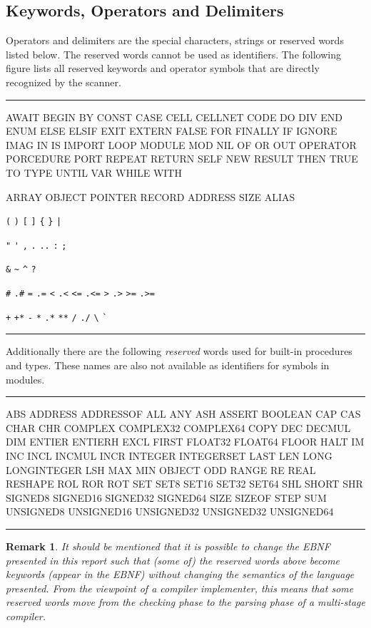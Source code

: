 \documentclass[a4wide,11pt]{article}
\newtheorem{remark}{Remark}
\newcommand{\srcfont}{\usefont{T1}{lmtt}{b}{n}}
\newenvironment{codebox}{%
\par
\begin{minipage}{\linewidth}
\hrule\vspace{0.1cm}
}{
\vspace{0.1cm}
\hrule
\end{minipage}
}
\begin{document}
\subsection{Keywords, Operators and Delimiters}
Operators and delimiters are the special characters, strings or reserved words listed below.
The reserved words cannot be used as identifiers.
The following figure lists all reserved keywords and operator symbols that are directly recognized by the scanner.

\begin{codebox}
{\srcfont
AWAIT BEGIN BY CONST CASE CELL CELLNET CODE DO DIV END ENUM ELSE ELSIF EXIT EXTERN FALSE FOR FINALLY IF IGNORE IMAG IN IS IMPORT LOOP MODULE MOD NIL OF OR OUT OPERATOR PORCEDURE PORT REPEAT RETURN SELF NEW RESULT THEN TRUE TO TYPE UNTIL VAR WHILE WITH

ARRAY OBJECT POINTER RECORD ADDRESS SIZE ALIAS
}

\verb~(~ \verb~)~ \verb~[~ \verb~]~ \verb~{~ \verb~}~ \verb~|~

\verb~"~ \verb~'~ \verb~,~ \verb~.~ \verb~..~ \verb~:~ \verb~;~

\verb~&~ \verb.~. \verb~^~  \verb~?~

\verb~#~ \verb~.#~ \verb~=~ \verb~.=~ \verb~<~ \verb~.<~ \verb~<=~ \verb~.<=~ \verb~>~ \verb~.>~ \verb~>=~ \verb~.>=~

\verb~+~ \verb~+*~ \verb~-~ \verb~*~ \verb~.*~ \verb~**~  \verb~/~ \verb~./~ \verb~\~ \verb~`~

\end{codebox}

Additionally there are the following \emph{reserved} words used for built-in procedures and types.
These names are also not available as identifiers for symbols in modules.



\begin{codebox}
\srcfont
ABS
ADDRESS
ADDRESSOF
ALL
ANY
ASH
ASSERT
BOOLEAN
CAP
CAS
CHAR
CHR
COMPLEX
COMPLEX32
COMPLEX64
COPY
DEC
DECMUL
DIM
ENTIER
ENTIERH
EXCL
FIRST
FLOAT32
FLOAT64
FLOOR
HALT
IM
INC
INCL
INCMUL
INCR
INTEGER
INTEGERSET
LAST
LEN
LONG
LONGINTEGER
LSH
MAX
MIN
OBJECT
ODD
RANGE
RE
REAL
RESHAPE
ROL
ROR
ROT
SET
SET8
SET16
SET32
SET64
SHL
SHORT
SHR
SIGNED8
SIGNED16
SIGNED32
SIGNED64
SIZE
SIZEOF
STEP
SUM
UNSIGNED8
UNSIGNED16
UNSIGNED32
UNSIGNED32
UNSIGNED64
\end{codebox}

\begin{remark}
It should be mentioned that it is possible to change the EBNF presented in this report such that (some of) the reserved words above become keywords (appear in the EBNF) without changing the semantics of the language presented.
From the viewpoint of a compiler implementer, this means that some reserved words move from the checking phase to the parsing phase of a multi-stage compiler.
\end{remark}
\end{document}
